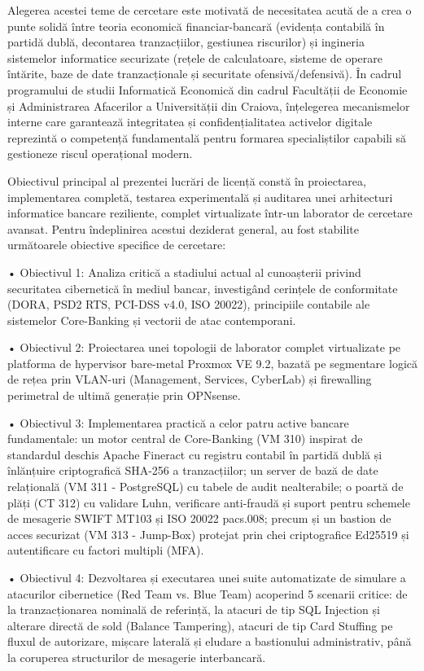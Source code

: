 Alegerea acestei teme de cercetare este motivată de necesitatea acută de a crea o punte solidă între teoria economică financiar-bancară (evidența contabilă în partidă dublă, decontarea tranzacțiilor, gestiunea riscurilor) și ingineria sistemelor informatice securizate (rețele de calculatoare, sisteme de operare întărite, baze de date tranzacționale și securitate ofensivă/defensivă). În cadrul programului de studii Informatică Economică din cadrul Facultății de Economie și Administrarea Afacerilor a Universității din Craiova, înțelegerea mecanismelor interne care garantează integritatea și confidențialitatea activelor digitale reprezintă o competență fundamentală pentru formarea specialiștilor capabili să gestioneze riscul operațional modern.

Obiectivul principal al prezentei lucrări de licență constă în proiectarea, implementarea completă, testarea experimentală și auditarea unei arhitecturi informatice bancare reziliente, complet virtualizate într-un laborator de cercetare avansat. Pentru îndeplinirea acestui deziderat general, au fost stabilite următoarele obiective specifice de cercetare:

• Obiectivul 1: Analiza critică a stadiului actual al cunoașterii privind securitatea cibernetică în mediul bancar, investigând cerințele de conformitate (DORA, PSD2 RTS, PCI-DSS v4.0, ISO 20022), principiile contabile ale sistemelor Core-Banking și vectorii de atac contemporani.

• Obiectivul 2: Proiectarea unei topologii de laborator complet virtualizate pe platforma de hypervisor bare-metal Proxmox VE 9.2, bazată pe segmentare logică de rețea prin VLAN-uri (Management, Services, CyberLab) și firewalling perimetral de ultimă generație prin OPNsense.

• Obiectivul 3: Implementarea practică a celor patru active bancare fundamentale: un motor central de Core-Banking (VM 310) inspirat de standardul deschis Apache Fineract cu registru contabil în partidă dublă și înlănțuire criptografică SHA-256 a tranzacțiilor; un server de bază de date relațională (VM 311 - PostgreSQL) cu tabele de audit nealterabile; o poartă de plăți (CT 312) cu validare Luhn, verificare anti-fraudă și suport pentru schemele de mesagerie SWIFT MT103 și ISO 20022 pacs.008; precum și un bastion de acces securizat (VM 313 - Jump-Box) protejat prin chei criptografice Ed25519 și autentificare cu factori multipli (MFA).

• Obiectivul 4: Dezvoltarea și executarea unei suite automatizate de simulare a atacurilor cibernetice (Red Team vs. Blue Team) acoperind 5 scenarii critice: de la tranzacționarea nominală de referință, la atacuri de tip SQL Injection și alterare directă de sold (Balance Tampering), atacuri de tip Card Stuffing pe fluxul de autorizare, mișcare laterală și eludare a bastionului administrativ, până la coruperea structurilor de mesagerie interbancară.

